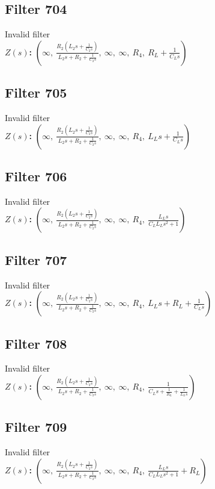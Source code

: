 \documentclass{article}
\begin{document}
\subsection*{Filter 704}
Invalid filter \\ 
\textbf{$Z(s)$:} $\left( \infty, \  \frac{R_{2} \left(L_{2} s + \frac{1}{C_{2} s}\right)}{L_{2} s + R_{2} + \frac{1}{C_{2} s}}, \  \infty, \  \infty, \  R_{4}, \  R_{L} + \frac{1}{C_{L} s}\right)$ \\ 
\subsection*{Filter 705}
Invalid filter \\ 
\textbf{$Z(s)$:} $\left( \infty, \  \frac{R_{2} \left(L_{2} s + \frac{1}{C_{2} s}\right)}{L_{2} s + R_{2} + \frac{1}{C_{2} s}}, \  \infty, \  \infty, \  R_{4}, \  L_{L} s + \frac{1}{C_{L} s}\right)$ \\ 
\subsection*{Filter 706}
Invalid filter \\ 
\textbf{$Z(s)$:} $\left( \infty, \  \frac{R_{2} \left(L_{2} s + \frac{1}{C_{2} s}\right)}{L_{2} s + R_{2} + \frac{1}{C_{2} s}}, \  \infty, \  \infty, \  R_{4}, \  \frac{L_{L} s}{C_{L} L_{L} s^{2} + 1}\right)$ \\ 
\subsection*{Filter 707}
Invalid filter \\ 
\textbf{$Z(s)$:} $\left( \infty, \  \frac{R_{2} \left(L_{2} s + \frac{1}{C_{2} s}\right)}{L_{2} s + R_{2} + \frac{1}{C_{2} s}}, \  \infty, \  \infty, \  R_{4}, \  L_{L} s + R_{L} + \frac{1}{C_{L} s}\right)$ \\ 
\subsection*{Filter 708}
Invalid filter \\ 
\textbf{$Z(s)$:} $\left( \infty, \  \frac{R_{2} \left(L_{2} s + \frac{1}{C_{2} s}\right)}{L_{2} s + R_{2} + \frac{1}{C_{2} s}}, \  \infty, \  \infty, \  R_{4}, \  \frac{1}{C_{L} s + \frac{1}{R_{L}} + \frac{1}{L_{L} s}}\right)$ \\ 
\subsection*{Filter 709}
Invalid filter \\ 
\textbf{$Z(s)$:} $\left( \infty, \  \frac{R_{2} \left(L_{2} s + \frac{1}{C_{2} s}\right)}{L_{2} s + R_{2} + \frac{1}{C_{2} s}}, \  \infty, \  \infty, \  R_{4}, \  \frac{L_{L} s}{C_{L} L_{L} s^{2} + 1} + R_{L}\right)$ \\ 
\end{document}
